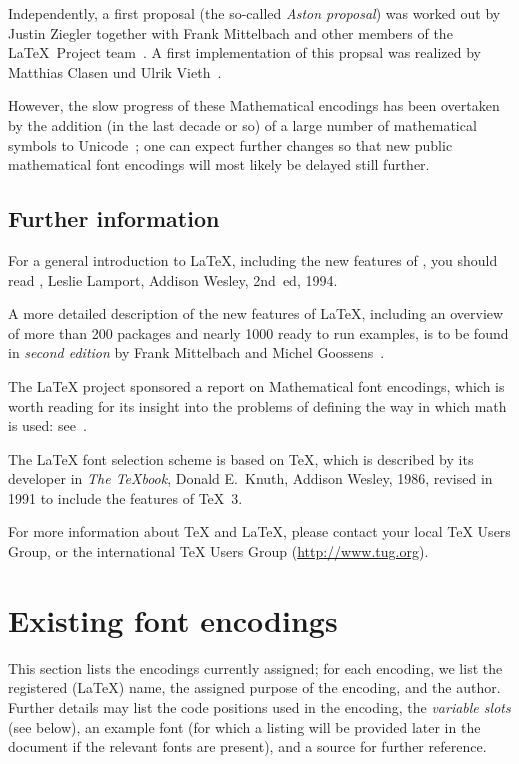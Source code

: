 \documentclass{ltxguide}[1994/11/20]
\begin{document}
Independently, a first proposal (the so-called \emph{Aston proposal}) was worked
out by Justin Ziegler together with Frank Mittelbach and other members of the
\LaTeX\ Project team~\cite{ziegler}. A first implementation of
this propsal was realized by Matthias Clasen und Ulrik
Vieth~\cite{clasen,clasen-vieth}.

However, the slow progress of these Mathematical encodings has been
overtaken by the addition (in the last decade or so) of a large number
of mathematical symbols to Unicode~\cite{beeton}; one can expect
further changes so that new public mathematical font encodings will
most likely be delayed still further.



\subsection{Further information}

For a general introduction to \LaTeX, including the new features of
\LaTeXe, you should read \emph{\LaTeXbook},
Leslie Lamport, Addison Wesley, 2nd~ed, 1994.

A more detailed description of the new features of \LaTeX, including an
overview of more than 200 packages and nearly 1000 ready to run examples, is
to be found in \emph{\LaTeXcomp{} second edition} by Frank Mittelbach and
Michel Goossens~\cite{A-W:MG2004}.

The \LaTeX{} project sponsored a report on Mathematical %
font encodings, which
is worth reading for its insight into the problems of defining the way
in which math is used: see~\cite{ziegler,clasen,clasen-vieth}.

The \LaTeX{} font selection scheme is based on \TeX, which is described
by its developer in \emph{The \TeX book}, Donald E.~Knuth, Addison
Wesley, 1986, revised in 1991 to include the features of \TeX~3.

For more information about \TeX{} and \LaTeX, please contact your local
\TeX{} Users Group, or the international \TeX{} Users Group
(\url{http://www.tug.org}).



\section{Existing font encodings}

This section lists the encodings currently assigned; for each
encoding, we list the registered (\LaTeX{}) name, the assigned purpose
of the encoding, and the author.  Further details may list the code
positions used in the encoding, the \emph{variable slots} (see below),
an example font (for which a listing will be provided later in the
document if the relevant fonts are present), and a source for further
reference.
\end{document}
